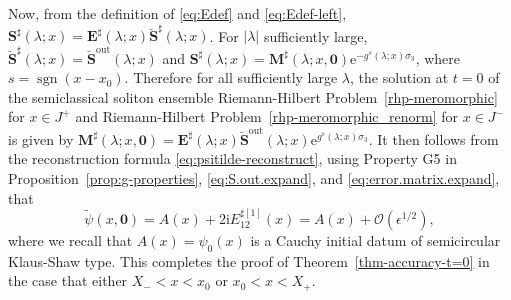\documentclass[12pt]{amsart}
\numberwithin{equation}{section}
\newcommand{\ee}{\mathrm{e}}
\newcommand{\ii}{\mathrm{i}}
\newcommand{\SP}{\lambda}
\newcommand{\eps}{\epsilon}
\newcommand{\bigo}[1]{ \mathcal{O}\! \left( #1 \right) }
\DeclareMathOperator{\sgn}{sgn}
\begin{document}
Now, from the definition of \eqref{eq:Edef} and \eqref{eq:Edef-left}, $\mathbf{S}^\sharp(\SP;x) = \mathbf{E}^\sharp(\SP;x) \breve{\mathbf{S}}^\sharp(\SP;x)$. For $|\SP|$  sufficiently large,  $ \breve{\mathbf{S}}^\sharp(\SP;x) = \breve{\mathbf{S}}^{\mathrm{out}}(\SP;x)$ and $\mathbf{S}^\sharp(\SP;x) = \mathbf{M}^\sharp(\SP;x,\mathbf{0}) \ee^{-g^{s}(\SP;x) \sigma_3 }$, where $s = \sgn(x-x_0)$. Therefore for all sufficiently large $\SP$, the solution at $t=0$ of the semiclassical soliton ensemble Riemann-Hilbert Problem~\ref{rhp-meromorphic} for $x \in J^+$ and Riemann-Hilbert Problem~\ref{rhp-meromorphic_renorm} for $x \in J^-$ is given by $\mathbf{M}^\sharp (\SP;x,\mathbf{0}) = \mathbf{E}^\sharp(\SP;x) \breve{\mathbf{S}}^\mathrm{out}(\SP;x) \ee^{g^{s}(\SP;x) \sigma_3 }$.
It then follows from the reconstruction formula \eqref{eq:psitilde-reconstruct}, using Property G5 in Proposition~\ref{prop:g-properties}, \eqref{eq:S.out.expand}, and \eqref{eq:error.matrix.expand}, that
\begin{equation}
	\widetilde{\psi}(x,\mathbf{0}) = A(x) + 2\ii E^{\sharp[1]}_{12}(x)  = A(x) + \bigo{\eps^{1/2}},
\end{equation}
where we recall that $A(x) = \psi_0(x)$ is a Cauchy initial datum of semicircular Klaus-Shaw type. 
This completes the proof of Theorem~\ref{thm-accuracy-t=0} in the case that either $X_-<x<x_0$ or $x_0<x<X_+$. 


\end{document}
